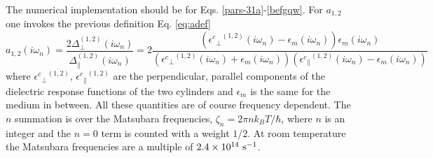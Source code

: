 \documentclass[onecolumn,letterpaper,amsmath,amssymb,floatfix,aps,superscriptaddress]{revtex4}
\begin{document}
The numerical implementation should be for Eqs. \ref{pars-31a}-\ref{befgqw}. For $a_{1,2}$ one invokes the previous definition Eq. \ref{eq:adef}
\begin{equation}
a_{1,2}(i \omega_n) = \frac{2 \Delta_{\perp}^{(1,2)}(i \omega_n)}{\Delta_{\parallel}^{(1,2)}(i \omega_n)} = 2 \frac{({{\epsilon^{c}}_{\perp}}^{(1,2)}(i \omega_n) -\epsilon_{m}(i \omega_n)) \epsilon_{m}(i \omega_n)}{({{\epsilon^{c}}_{\perp}}^{(1,2)}(i \omega_n)+\epsilon_{m}(i \omega_n)) ({{\epsilon^{c}}_{\parallel}}^{(1,2)}(i \omega_n) -\epsilon_{m}(i \omega_n))}
\label{eq:adef}
\end{equation}
where ${{\epsilon^{c}}_{\perp}}^{(1,2)}$, ${{\epsilon^{c}}_{\parallel}}^{(1,2)}$ are the perpendicular, parallel components of the dielectric response functions of the two cylinders and $\epsilon_{m}$ is the same for the medium in between. All these quantities are of course frequency dependent. The $n$ summation is over the Matsubara frequencies, $\zeta_n = 2\pi n k_BT/\hbar$, where $n$ is an integer and the $n=0$ term is counted with a weight $1/2$. At room temperature the Matsubara frequencies are a multiple of $\rm 2.4 \times 10^{14}~s^{-1}$.
\end{document}
